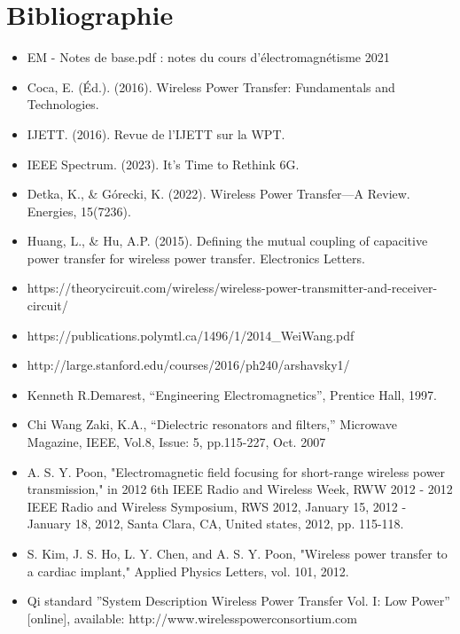 \documentclass[12pt,a4paper,titlepage,notitlepage]{article}
\begin{document}
	\section*{Bibliographie}
	\vspace{1cm}
	\begin{itemize}
		\item EM - Notes de base.pdf : notes du cours d'électromagnétisme 2021
		\item Coca, E. (Éd.). (2016). Wireless Power Transfer: Fundamentals and Technologies.
		\item IJETT. (2016). Revue de l'IJETT sur la WPT.
		\item IEEE Spectrum. (2023). It’s Time to Rethink 6G.
		\item Detka, K., \& Górecki, K. (2022). Wireless Power Transfer—A Review. Energies, 15(7236).
		\item Huang, L., \& Hu, A.P. (2015). Defining the mutual coupling of capacitive power transfer for wireless power transfer. Electronics Letters.
		\item https://theorycircuit.com/wireless/wireless-power-transmitter-and-receiver-circuit/
		\item https://publications.polymtl.ca/1496/1/2014\_WeiWang.pdf
		\item http://large.stanford.edu/courses/2016/ph240/arshavsky1/
		\item Kenneth R.Demarest, “Engineering Electromagnetics”, Prentice Hall, 1997. 
		\item  Chi Wang Zaki, K.A., “Dielectric resonators and filters,” Microwave Magazine, IEEE, 
		Vol.8, Issue: 5, pp.115-227, Oct. 2007
		\item  A. S. Y. Poon, "Electromagnetic field focusing for short-range wireless power 
		transmission," in 2012 6th IEEE Radio and Wireless Week, RWW 2012 - 2012 IEEE 
		Radio and Wireless Symposium, RWS 2012, January 15, 2012 - January 18, 2012, Santa 
		Clara, CA, United states, 2012, pp. 115-118. 
		\item S. Kim, J. S. Ho, L. Y. Chen, and A. S. Y. Poon, "Wireless power transfer to a cardiac 
		implant," Applied Physics Letters, vol. 101, 2012. 
		\item Qi standard ”System Description Wireless Power Transfer Vol. I: Low Power” [online], 
		available: http://www.wirelesspowerconsortium.com 
		
			
	\end{itemize}
	
	
	
	
	
	
	
	
	
	
	
	
	
	
	
	
	
	
	
	
	
	
	
	
	
	
	
	
	
	
\end{document}
